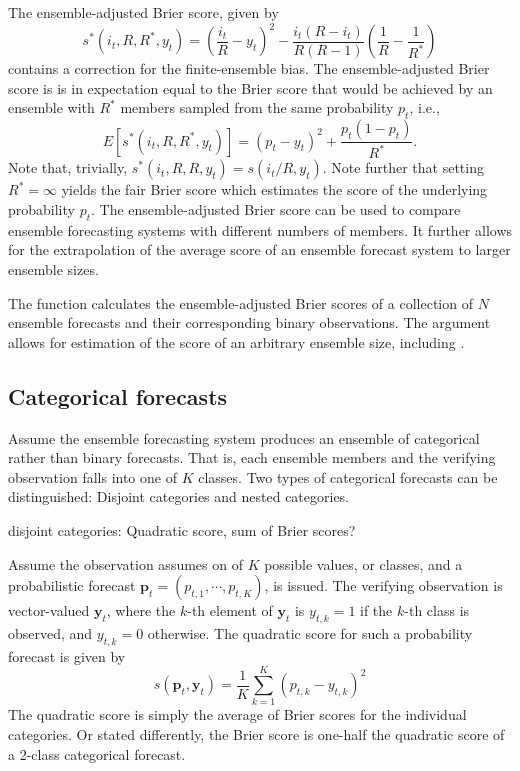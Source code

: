 \documentclass[article]{jss}
\begin{document}
The ensemble-adjusted Brier score, given by \citep{ferro2008effect}
%
\begin{equation}
s^*(i_t, R, R^*, y_t) = \left(\frac{i_t}{R} - y_t\right)^2 - \frac{i_t(R-i_t)}{R(R-1)}\left(\frac{1}{R} - \frac{1}{R^*}\right)
\label{eq:ens-brier}
\end{equation}
%
contains a correction for the finite-ensemble bias.
The ensemble-adjusted Brier score is is in expectation equal to the Brier score that would be achieved by an ensemble with $R^*$ members sampled from the same probability $p_t$, i.e., 
%
\begin{equation}
E\left[s^*(i_t, R, R^*, y_t)\right] = (p_t - y_t)^2 + \frac{p_t(1-p_t)}{R^*}.
\end{equation}
%
Note that, trivially, $s^*(i_t, R, R, y_t) = s(i_t/R, y_t)$.
Note further that setting $R^*=\infty$ yields the fair Brier score \citep{ferro2013fair} which estimates the score of the underlying probability $p_t$.
The ensemble-adjusted Brier score can be used to compare ensemble forecasting systems with different numbers of members.
It further allows for the extrapolation of the average score of an ensemble forecast system to larger ensemble sizes.


The  function  calculates the ensemble-adjusted Brier scores of a collection of $N$ ensemble forecasts and their corresponding binary observations. 
The argument  allows for estimation of the score of an arbitrary ensemble size, including .


\subsection{Categorical forecasts}


Assume the ensemble forecasting system produces an ensemble of categorical rather than binary forecasts.
That is, each ensemble members and the verifying observation falls into one of $K$ classes.
Two types of categorical forecasts can be distinguished: Disjoint categories and nested categories.

disjoint categories: Quadratic score, sum of Brier scores?

Assume the observation assumes on of $K$ possible values, or classes, and a probabilistic forecast $\mathbf{p}_t = (p_{t,1}, \cdots, p_{t,K})$, is issued.
The verifying observation is vector-valued $\mathbf{y}_t$, where the $k$-th element of $\mathbf{y}_t$ is $y_{t,k}=1$ if the $k$-th class is observed, and $y_{t,k}=0$ otherwise.
The quadratic score for such a probability forecast is given by
%
\begin{equation}
s(\mathbf{p}_t, \mathbf{y}_t) = \frac{1}{K}\sum_{k=1}^K \left(p_{t,k} - y_{t,k}\right)^2
\end{equation}
%
The quadratic score is simply the average of Brier scores for the individual categories.
Or stated differently, the Brier score is one-half the quadratic score of a 2-class categorical forecast.
\end{document}
